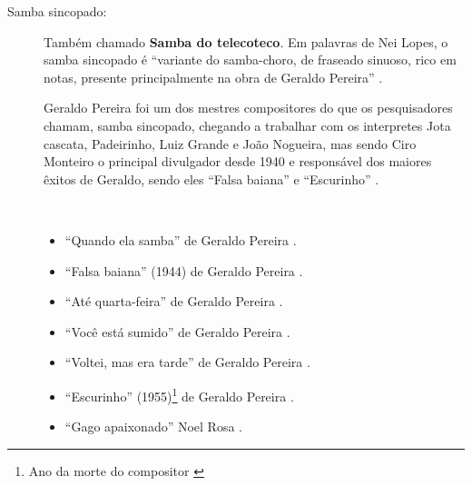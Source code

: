 \begin{description}

\item[Samba sincopado:] 
Também chamado \textbf{Samba do telecoteco}. 
Em palavras de Nei Lopes, o samba sincopado é 
``variante do samba-choro, de fraseado sinuoso, rico em notas, 
presente principalmente na obra de Geraldo Pereira'' \cite[pp. 22]{lopes2003sambeaba} \cite[pp. 68]{diniz2006almanaque}.

Geraldo Pereira foi um dos mestres compositores do que os pesquisadores chamam, samba sincopado,
chegando a trabalhar com os interpretes Jota cascata, Padeirinho, Luiz Grande e João Nogueira,
mas sendo Ciro Monteiro o principal divulgador desde 1940 e
responsável dos maiores êxitos de Geraldo, sendo eles ``Falsa baiana'' e ``Escurinho'' \cite[pp. 68]{diniz2006almanaque}.

\begin{example} ~

\begin{itemize}
\item ``Quando ela samba''  de Geraldo Pereira \cite[pp. 52]{diniz2006almanaque}.
\item ``Falsa baiana'' (1944) de Geraldo Pereira \cite[pp. 107]{de2003tem} \cite[pp. ]{beattie2003human} \cite[pp. 52]{diniz2006almanaque}.
\item ``Até quarta-feira'' de Geraldo Pereira \cite[pp. 52]{diniz2006almanaque}.
\item ``Você está sumido'' de Geraldo Pereira \cite[pp. 52]{diniz2006almanaque}.
\item ``Voltei, mas era tarde'' de Geraldo Pereira \cite[pp. 52]{diniz2006almanaque}.
\item ``Escurinho'' (1955)\footnote{Ano da morte do compositor \cite[pp. 69]{diniz2006almanaque}} de Geraldo Pereira \cite[pp. 69]{diniz2006almanaque}.
\item ``Gago apaixonado'' Noel Rosa \cite[pp. 129]{perna2002samba}.
\end{itemize}
\end{example}

\end{description}

